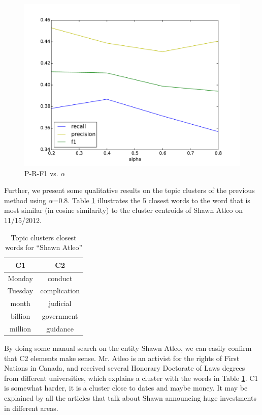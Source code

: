 \documentclass{article}
\begin{document}
{{\begin{figure}[tb]
\centering
\includegraphics[width=0.8\columnwidth]{fig/alphaPlotMacro.pdf}
\caption{P-R-F1 vs. $\alpha$}
\label{varyingalpha}
\end{figure}

Further, we present some qualitative results on the topic clusters of the previous method using $\alpha\mathord{=}0.8$. Table \ref{clusterresult} illustrates the 5 closest words to the word that is most similar (in cosine similarity) to the cluster centroids of Shawn Atleo on 11/15/2012.

\begin{table}[tb]
\center
\begin{tabular}{cc}
\toprule
\textbf{C1} & \textbf{C2} \\
\midrule
Monday & conduct \\ %
Tuesday & complication \\ %
month & judicial \\ %
billion & government \\ %
million & guidance \\
\bottomrule
\end{tabular}
\caption{Topic clusters closest words for ``Shawn Atleo''}
\label{clusterresult}
\end{table}

By doing some manual search on the entity Shawn Atleo, we can easily confirm that C2 elements make sense. Mr. Atleo is an activist for the rights of First Nations in Canada, and received several Honorary Doctorate of Laws degrees from different universities, which explains a cluster with the words in Table \ref{clusterresult}. C1 is somewhat harder, it is a cluster close to dates and maybe money. It may be explained by all the articles that talk about Shawn announcing huge investments in different areas.


}}
\end{document}
